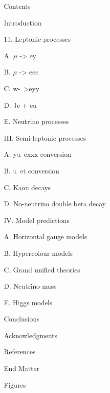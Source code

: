 \documentclass[twoside]{article}
\begin{document}
Contents

Introduction

11. Leptonic processes


A. $\mu$ -> ey

B.  $\mu$ -> eee

C. w-~>eyy

D. Je + eu

E. Neutrino processes

III. Semi-leptonic processes

A. yu~exxx conversion

B. u~et conversion

C. Kaon decays

D. No-neutrino double beta decay

IV. Model predictions

A. Horizontal gauge models

B. Hypercolour models

C. Grand unified theories

D. Neutrino mass

E. Higgs models

Conclusions

Acknowledgments

References

End Matter

Figures
\end{document}
